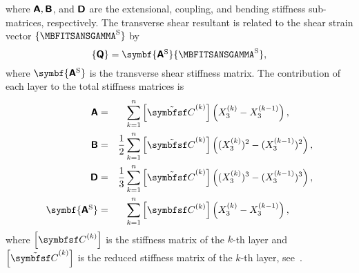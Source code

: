 where $\mat{A},\mat{B}$, and $\mat{D}$ are the extensional, coupling, and bending stiffness sub-matrices, respectively. The transverse shear resultant is related to the shear strain vector $\col{\mbfitsansgamma^\text{\normalfont s}}$ by
\begin{equation}
	\col{q}=\symbf{\mat{A^\text{\normalfont s}}} \col{\mbfitsansgamma^\text{\normalfont s}},
\end{equation}
where $\symbf{\mat{A^\text{\normalfont s}}}$ is the transverse shear stiffness matrix. The contribution of each layer to the total stiffness matrices is
\begin{alignat}{3}
\mat{A}&=&                              \sum_{k=1}^{n}& \left[{\tilde{\symbfsf C}}^{(k)}\right] \left(X_3^{(k)}- X_3^{(k-1)}\right),\\
\mat{B}&=&                   \frac{1}{2}\sum_{k=1}^{n}& \left[{\tilde{\symbfsf C}}^{(k)}\right] \left( (X_3^{(k)})^2- (X_3^{(k-1)})^2\right),\\
\mat{D}&=&                   \frac{1}{3}\sum_{k=1}^{n}& \left[{\tilde{\symbfsf C}}^{(k)}\right] \left( (X_3^{(k)})^3- (X_3^{(k-1)})^3\right),\\
\symbf{\mat{A^\text{\normalfont s}}} &=&\sum_{k=1}^{n}& \left[{\symbfsf C}^{(k)}\right] \left(X_3^{(k)}- X_3^{(k-1)}\right),
\end{alignat}
where $\left[{\symbfsf C}^{(k)}\right]$ is the stiffness matrix of the $k$-th layer and $\left[{\tilde{\symbfsf C}}^{(k)}\right]$ is the reduced stiffness matrix of the $k$-th layer, see~\autocite{Altenbach.2010c,Herakovich.1998,Barbero.2017}.




